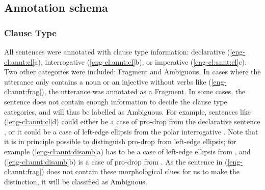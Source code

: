 \subsection{Annotation schema}
\label{sec:engcl:corpus:schema}

\subsubsection{Clause Type}

All sentences were annotated with clause type information: declarative (\ref{eng-cl:annt:cl}a), interrogative (\ref{eng-cl:annt:cl}b), or imperative (\ref{eng-cl:annt:cl}c). Two other categories were included: Fragment and Ambiguous. In cases where the utterance only contains a noun or an injective without verbs like (\ref{eng-cl:annt:frag}), the utterance was annotated as a Fragment. In some cases, the sentence does not contain enough information to decide the clause type categories, and will thus be labelled as Ambiguous. For example, sentences like (\ref{eng-cl:annt:cl}d) could either be a case of pro-drop from the declarative sentence , or it could be a case of left-edge ellipsis from the polar interrogative . Note that it is in principle possible to distinguish pro-drop from left-edge ellipsis; for example (\ref{eng-cl:annt:disamb}a) has to be a case of left-edge ellipsis from , and (\ref{eng-cl:annt:disamb}b) is a case of pro-drop from . As the sentence in (\ref{eng-cl:annt:frag}) does not contain these morphological clues for us to make the distinction, it will be classified as Ambiguous.

